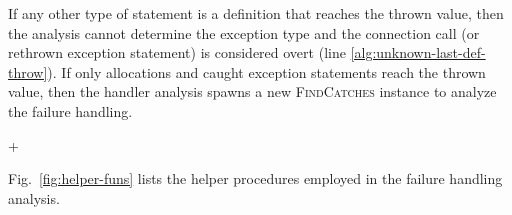 If any other type of statement is a definition that reaches the thrown
value, then the analysis cannot determine the exception type and the
connection call (or rethrown exception statement) is considered
overt (line \ref{alg:unknown-last-def-throw}).  If only
allocations and caught exception statements reach the thrown value,
then the handler analysis spawns a new \textsc{FindCatches} instance
to analyze the failure handling. 












\lstDeleteShortInline+


Fig.~\ref{fig:helper-funs} lists the helper procedures employed in
the failure handling analysis.

